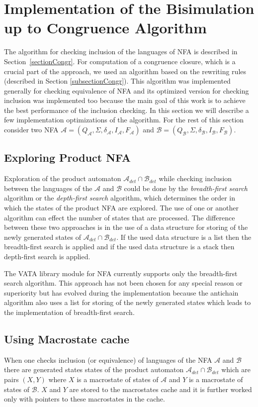 \section{Implementation of the Bisimulation up to Congruence Algorithm}
\label{sectionCongrImpl}
The algorithm for checking inclusion of the languages of NFA is described in Section~\ref{sectionCongr}. For computation of a congruence closure, 
which is a crucial part of the approach, we used an algorithm based on the rewriting rules (described in Section \ref{subsectionCongr}). 
This algorithm was implemented generally for checking equivalence of NFA and its optimized version for checking inclusion was implemented too 
because the main goal of this work is to achieve the best performance of the inclusion checking. In this section we will describe a few implementation
optimizations of the algorithm. 
For the rest of this section consider two NFA $\mathcal{A}=(Q_\mathcal{A},\Sigma,\delta_\mathcal{A},I_\mathcal{A},F_\mathcal{A})$ and
$\mathcal{B}=(Q_\mathcal{B},\Sigma,\delta_\mathcal{B},I_\mathcal{B},F_\mathcal{B})$.


\subsection{Exploring Product NFA}
Exploration of the product automaton $\mathcal{A}_{det}\cap\mathcal{B}_{det}$ while checking inclusion between the languages of the 
$\mathcal{A}$ and $\mathcal{B}$ could be done by 
the \emph{breadth-first search} \cite{taocp} algorithm or the \emph{depth-first search} \cite{taocp} algorithm, which
determines the order in which the states of the product NFA are explored. The use of one or another algorithm can effect the number of states that are processed. 
The difference between these two approaches is in the use of a data structure for storing of the newly generated states 
of $\mathcal{A}_{det}\cap\mathcal{B}_{det}$.
If the used data structure is a list then the breadth-first search is applied and if the used data structure is a stack then 
depth-first search is applied.

The VATA library module for NFA currently supports only the breadth-first search algorithm. This approach has not been chosen for any special reason or superiority
but has evolved during the implementation because the antichain algorithm also uses a list for storing of 
the newly generated states which leads to the implementation of breadth-first search.


\subsection{Using Macrostate cache}
When one checks inclusion (or equivalence) of languages of the NFA $\mathcal{A}$ and $\mathcal{B}$ there are generated states states of the 
product automaton $\mathcal{A}_{det}\cap\mathcal{B}_{det}$ 
which are pairs $(X,Y)$ where $X$ is a macrostate of states of $\mathcal{A}$ and $Y$ is a macrostate of states of $\mathcal{B}$. $X$ and $Y$
are stored to the macrostates cache and it is further worked only with pointers to these macrostates in the cache.

